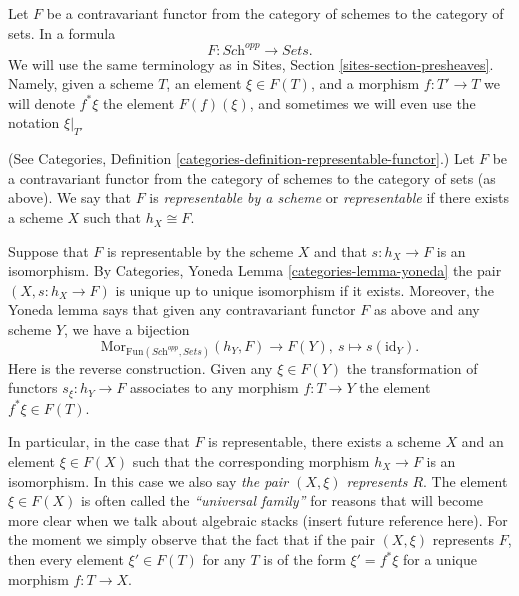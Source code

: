 \medskip\noindent
Let $F$ be a contravariant functor from the category
of schemes to the category of sets. In a formula
$$
F : \textit{Sch}^{opp}
\longrightarrow
\textit{Sets}.
$$
We will use the same terminology as in Sites, Section
\ref{sites-section-presheaves}. Namely, given a scheme
$T$, an element $\xi \in F(T)$, and a morphism $f : T' \to T$
we will denote $f^*\xi$ the element $F(f)(\xi)$, and sometimes
we will even use the notation $\xi|_{T'}$

\begin{definition}
\label{definition-representable-functor}
(See Categories, Definition \ref{categories-definition-representable-functor}.)
Let $F$ be a contravariant functor from the category
of schemes to the category of sets (as above).
We say that $F$ is {\it representable by a scheme}
or {\it representable} if there exists a scheme $X$
such that $h_X \cong F$.
\end{definition}

\noindent
Suppose that $F$ is representable by the scheme $X$ and that
$s : h_X \to F$ is an isomorphism.
By Categories, Yoneda Lemma \ref{categories-lemma-yoneda}
the pair $(X, s : h_X \to F)$ is unique up to unique
isomorphism if it exists.
Moreover, the Yoneda lemma says that
given any contravariant functor $F$ as above
and any scheme $Y$, we have a bijection
$$
\text{Mor}_{\text{Fun}(\textit{Sch}^{opp}, \textit{Sets})} (h_Y, F)
\longrightarrow
F(Y),\ 
s \longmapsto s(\text{id}_Y).
$$
Here is the reverse construction. Given any $\xi \in F(Y)$
the transformation of functors $s_\xi : h_Y \to F$
associates to any morphism $f : T \to Y$ the
element $f^*\xi \in F(T)$.

\medskip\noindent
In particular, in the case that $F$ is representable, there exists
a scheme $X$ and an element $\xi \in F(X)$ such that the corresponding
morphism $h_X \to F$ is an isomorphism.
In this case we also say {\it the pair $(X, \xi)$ represents $R$}.
The element $\xi \in F(X)$
is often called the {\it ``universal family''} for reasons that will become
more clear when we talk about algebraic stacks (insert future reference here).
For the moment we simply observe that the fact that if the pair $(X, \xi)$
represents $F$, then every element $\xi' \in F(T)$ for any $T$ is of
the form $\xi' = f^*\xi$ for a unique morphism $f : T \to X$.

